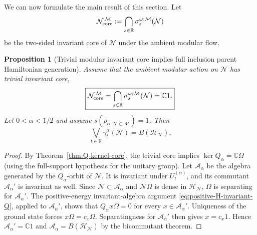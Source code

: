\documentclass[a4paper,11pt]{article}
\newtheorem{proposition}[theorem]{Proposition}
\theoremstyle{definition}
\newcommand{\mN}{\mathcal{N}}
\newcommand{\mH}{\mathcal{H}}
\newcommand{\mM}{\mathcal{M}}
\begin{document}
We can now formulate the main result of this section. Let
\begin{equation}
    \mN_{\rm core}^{\,\mM}
    :=
    \bigcap_{s\in\mathbb R}
    \sigma_s^{\omega;\mM}(\mN)
    \label{eq:ambient-memory-probing}
\end{equation}
be the two-sided invariant core of $\mN$ under the ambient modular flow.

\begin{proposition}[Trivial modular invariant core implies full inclusion parent Hamiltonian generation]
\label{prop:Halpha-full-generation}
Assume that the ambient modular action on $\mN$ has trivial invariant core,
\begin{equation}
    \boxed{
    \mN_{\rm core}^{\,\mM}
    =
    \bigcap_{s\in\mathbb R}
    \sigma_s^{\omega;\mM}(\mN)
    =
    \mathbb C1.
    }
    \label{eq:ambient-forgetful-probing}
\end{equation}
Let $0<\alpha<1/2$ and assume
$s(\rho_{\alpha,\mN\subset\mM})=1$. Then
\begin{equation}
    \boxed{
    \bigvee_{t\in\mathbb R}
    \gamma_t^\alpha(\mN)
    =
    B(\mH_{\mN}).
    }
    \label{eq:Halpha-full-BHN}
\end{equation}
\end{proposition}

\begin{proof}
By Theorem~\ref{thm:Q-kernel-core}, the trivial core implies
$\ker Q_\alpha=\mathbb C\Omega$ (using the full-support
hypothesis for the unitary group). Let $\mathcal A_\alpha$
be the algebra generated by the $Q_\alpha$-orbit of $\mN$.
It is invariant under $U_t^{(\alpha)}$, and its commutant
$\mathcal A_\alpha'$ is invariant as well. Since
$\mN\subset\mathcal A_\alpha$ and $\mN\Omega$ is dense
in $\mH_\mN$, $\Omega$ is separating for $\mathcal A_\alpha'$.
The positive-energy invariant-algebra argument
\eqref{eq:positive-H-invariant-Q}, applied to
$\mathcal A_\alpha'$, shows that
$Q_\alpha x\Omega=0$ for every $x\in\mathcal A_\alpha'$.
Uniqueness of the ground state forces $x\Omega=c_x\Omega$.
Separatingness for $\mathcal A_\alpha'$ then gives
$x=c_x1$. Hence $\mathcal A_\alpha'=\mathbb C1$ and
$\mathcal A_\alpha=B(\mH_\mN)$ by the bicommutant theorem.
\end{proof}
\end{document}
